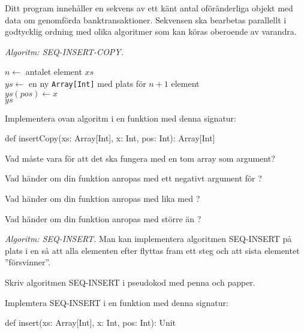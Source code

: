 \Subtask Ditt program innehåller en sekvens av ett känt antal oföränderliga objekt med data om genomförda banktransaktioner. Sekvensen ska bearbetas parallellt i godtycklig ordning med olika algoritmer som kan köras oberoende av varandra.


\ExtraTasks %

\Task \emph{Algoritm: SEQ-INSERT-COPY.}

\begin{algorithm}[H]

 $n \leftarrow$ antalet element $xs$\\
 $ys \leftarrow$ en ny \texttt{Array[Int]} med plats för $n+1$ element \\
 $ys(pos) \leftarrow x$ \\
 \Return $ys$
\end{algorithm}

\Subtask Implementera ovan algoritm i en funktion med denna signatur:
\begin{Code}
def insertCopy(xs: Array[Int], x: Int, pos: Int): Array[Int]
\end{Code}

\Subtask Vad måste  vara för att det ska fungera med en tom array som argument?

\Subtask Vad händer om din funktion anropas med ett negativt argument för ?

\Subtask Vad händer om din funktion anropas med  lika med ?

\Subtask Vad händer om din funktion anropas med  större än ?



\Task \emph{Algoritm: SEQ-INSERT.} Man kan implementera algoritmen SEQ-INSERT på plats i en  så att alla elementen efter  flyttas fram ett steg och att sista elementet ''försvinner''.

\Subtask\Pen Skriv algoritmen SEQ-INSERT i pseudokod med penna och papper.

\Subtask Implemtera SEQ-INSERT i en funktion med denna signatur:
\begin{Code}
def insert(xs: Array[Int], x: Int, pos: Int): Unit
\end{Code}

